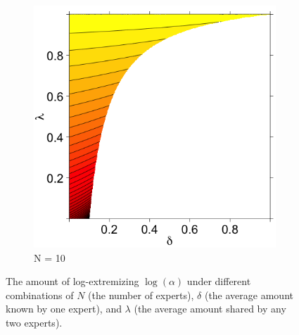 \documentclass[11pt]{article}
\theoremstyle{definition}
\theoremstyle{definition}
\begin{document}
\begin{figure}[t]
\begin{subfigure}[b]{0.499\textwidth}
                \includegraphics[width=\textwidth]{ExtremeN10}
\caption{N = 10}
\label{ExtremeN10}
        \end{subfigure}
        \caption{ The amount of log-extremizing $\log(\alpha)$ under different combinations of $N$ (the number of experts), $\delta$ (the average amount known by one expert), and $\lambda$ (the average amount shared by any two experts).}
        \label{Levelplots}
\end{figure}
\end{document}
